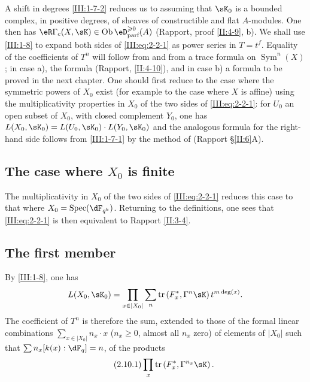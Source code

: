 A shift in degrees \ref{III:1-7-2} reduces us to assuming
that $\sK_0$ is a bounded complex, in positive degrees, of sheaves of
constructible and flat $A$-modules. One then has
$\eR\Gamma_c(X,\sK)\in \ob\eD_\text{parf}^{\geqslant 0}(A)$ (Rapport,
proof \ref{II:4-9}, b). We shall use \ref{III:1-8} to expand
both sides of \eqref{III:eq:2-2-1} as power series in $T=t^f$.
Equality of the coefficients of $T^n$ will follow from
\cite[XVII 5.5.21]{sga4} and from a trace formula on
$\operatorname{Sym}^n(X)$; in case a), the formula (Rapport,
\ref{II:4-10}), and in case b) a formula to be proved in the
next chapter. One should first reduce to the case where the
symmetric powers of $X_0$ exist (for example to the case where $X$ is
affine) using the multiplicativity properties in $X_0$ of the two
sides of \eqref{III:eq:2-2-1}: for $U_0$ an open subset of $X_0$, with closed
complement $Y_0$, one has $L(X_0,\sK_0)=L(U_0,\sK_0)\cdot L(Y_0,\sK_0)$ and
the analogous formula for the right-hand side follows from \ref{III:1-7-1}
by the method of (Rapport \S\ref{II:6}A).




\subsection{The case where $X_0$ is finite}\label{III:2-9}

The multiplicativity in $X_0$ of the two sides of \eqref{III:eq:2-2-1}
reduces this case to that where $X_0=\spec(\dF_{q^k})$. Returning to the
definitions, one sees that \eqref{III:eq:2-2-1} is then equivalent to
Rapport \ref{II:3-4}.




\subsection{The first member}\label{III:2-10}

By \ref{III:1-8}, one has
\[
  L(X_0,\sK_0) = \prod_{x\in |X_0|} \sum_n \tr\left(F_x^*,\Gamma^n\sK\right) t^{m\deg(x)} \text{.}
\]
The coefficient of $T^n$ is therefore the sum, extended to those of the
formal linear combinations $\sum_{x\in |X_0|} n_x\cdot x$
($n_x\geqslant 0$, almost all $n_x$ zero) of elements of $|X_0|$
such that $\sum n_x [k(x):\dF_q] = n$, of the products
\begin{equation*}\tag{2.10.1}\label{III:eq:2-10-1}
  \prod_x \tr\left(F_x^*,\Gamma^{n_x} \sK\right) \text{.}
\end{equation*}

